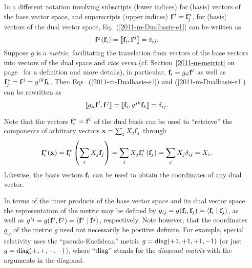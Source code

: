 In a different notation involving subscripts (lower indices) for (basis) vectors of the base vector space,
and superscripts (upper indices) ${\bf f}^j = {\bf f}_j^\ast $,
for (basis) vectors of the dual vector space,
Eq.~(\ref{2011-m-Dualbasis-e1}) can be written as
\begin{equation}
{\bf f}^j ( {\bf f}_i ) = \llbracket {\bf f}_i,{\bf f}^j\rrbracket =\delta_{ij}.
\label{2011-m-Dualbasis-e2}
\end{equation}
Suppose
$g$ is a {\em metric},
facilitating the translation from vectors of the base vectors into vectors of the dual space and {\it vice versa}
(cf. Section~\ref{2011-m-metrict} on page~\pageref{2011-m-metrict} for a definition and more details),
in particular, ${\bf f}_i =  g_{il}{\bf f}^l$
as well as  ${\bf f}_j^\ast  = {\bf f}^j = g^{jk}{\bf f}_k$.
Then Eqs.~(\ref{2011-m-Dualbasis-e1}) and (\ref{2011-m-Dualbasis-e1}) can be rewritten as
\begin{equation}
\llbracket g_{il} {\bf f}^l, {\bf f}^j\rrbracket     = \llbracket {\bf f}_i, g^{jk} {\bf f}_k\rrbracket   = \delta_{ij}.
\label{2011-m-Dualbasis-e3}
\end{equation}

Note that the vectors ${\bf f}^\ast_i = {\bf f}^i$ of the dual basis can be used to ``retrieve'' the components of arbitrary vectors
${\bf x} = \sum_j X_j {\bf f}_j$  through
\begin{equation}
{\bf f}^\ast_i ( {\bf x} ) =
{\bf f}^\ast_i \left( \sum_j X_j {\bf f}_j \right) =
\sum_j  X_j {\bf f}^\ast_i \left({\bf f}_j \right) =
\sum_j  X_j \delta_{ij} =
X_i.
\label{2016-m-fdlvs-recoverc}
\end{equation}
Likewise, the basis vectors ${\bf f}_i$ can be used to obtain the coordinates of any dual vector.



In terms of the inner products of the base vector space and its dual vector space the representation
of the metric
may be defined by
$g_{ij}=g({\bf f}_i,{\bf f}_j)=\langle {\bf f}_i\mid {\bf f}_j\rangle$,
as well as
$g^{ij}=g({\bf f}^i,{\bf f}^j) =\langle {\bf f}^i\mid {\bf f}^j\rangle$, respectively.
Note however, that the coordinates $g_{ij}$ of
the metric $g$ need not necessarily be positive definite.
For example,  special relativity uses the ``pseudo-Euclidean'' metric
 $g={\rm diag}(+1,+1,+1,-1)$ (or just $g={\rm diag}(+,+,+,-)$), where ``${\rm diag}$''
stands for the {\em diagonal matrix}
with the arguments in the diagonal.




